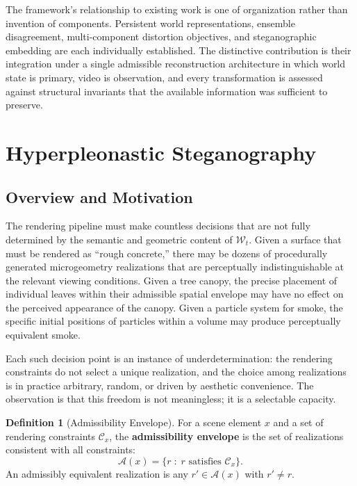 \documentclass[12pt,a4paper]{article}
\theoremstyle{plain}
\theoremstyle{definition}
\newtheorem{definition}[theorem]{Definition}
\theoremstyle{remark}
\begin{document}
The framework's relationship to existing work is one of organization rather than invention of components. Persistent world representations, ensemble disagreement, multi-component distortion objectives, and steganographic embedding are each individually established. The distinctive contribution is their integration under a single admissible reconstruction architecture in which world state is primary, video is observation, and every transformation is assessed against structural invariants that the available information was sufficient to preserve.


\appendix

\section{Hyperpleonastic Steganography}
\label{app:steg}

\subsection{Overview and Motivation}

The rendering pipeline must make countless decisions that are not fully determined by the semantic and geometric content of $\mathcal{W}_t$. Given a surface that must be rendered as ``rough concrete,'' there may be dozens of procedurally generated microgeometry realizations that are perceptually indistinguishable at the relevant viewing conditions. Given a tree canopy, the precise placement of individual leaves within their admissible spatial envelope may have no effect on the perceived appearance of the canopy. Given a particle system for smoke, the specific initial positions of particles within a volume may produce perceptually equivalent smoke.

Each such decision point is an instance of underdetermination: the rendering constraints do not select a unique realization, and the choice among realizations is in practice arbitrary, random, or driven by aesthetic convenience. The observation is that this freedom is not meaningless; it is a selectable capacity.

\begin{definition}[Admissibility Envelope]
For a scene element $x$ and a set of rendering constraints $\mathcal{C}_x$, the \textbf{admissibility envelope} is the set of realizations consistent with all constraints:
\[
\mathcal{A}(x) = \{ r \;:\; r \text{ satisfies } \mathcal{C}_x \}.
\]
An admissibly equivalent realization is any $r' \in \mathcal{A}(x)$ with $r' \neq r$.
\end{definition}
\end{document}
